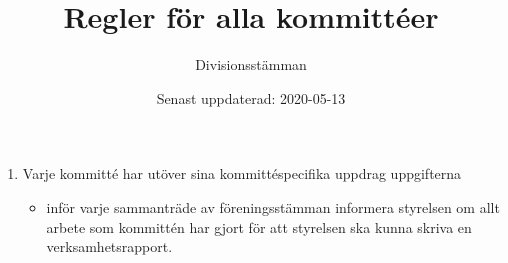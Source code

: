 \documentclass{dvd}
\begin{document}
	\title{Regler för alla kommittéer}
	\author{Divisionsstämman}
	\date{Senast uppdaterad: 2020-05-13}

	\begin{enumerate}[label=\arabic* §, ref=\arabic*]
		\item Varje kommitté har utöver sina kommittéspecifika uppdrag uppgifterna

		\begin{itemize}

			\item inför varje sammanträde av föreningsstämman informera styrelsen om allt arbete som kommittén har gjort för att styrelsen ska kunna skriva en verksamhetsrapport.

		\end{itemize}
	\end{enumerate}
\end{document}
